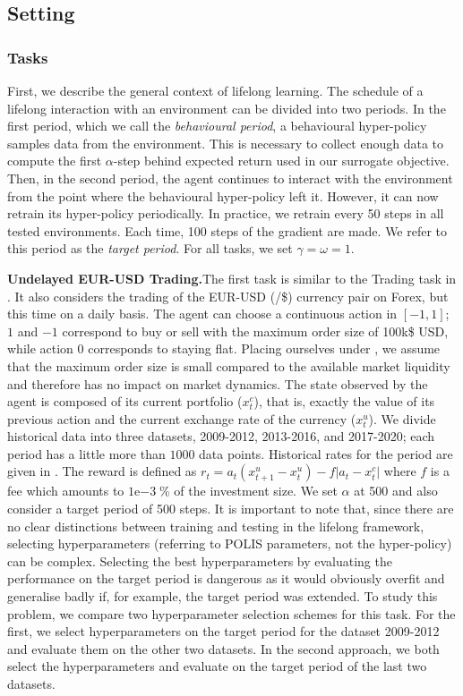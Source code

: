 \subsection{Setting}
\label{subsec:setting_exp_lifelong}


\subsubsection{Tasks}
First, we describe the general context of lifelong learning. 
The schedule of a lifelong interaction with an environment can be divided into two periods. 
In the first period, which we call the \emph{behavioural period}, a behavioural hyper-policy samples data from the environment. 
This is necessary to collect enough data to compute the first {$\alpha$-step behind expected return} used in our surrogate objective.
Then, in the second period, the agent continues to interact with the environment from the point where the behavioural hyper-policy left it. However, it can now retrain its hyper-policy periodically.
In practice, we retrain every 50 steps in all tested environments.
Each time, 100 steps of the gradient are made.
We refer to this period as the \emph{target period}.
For all tasks, we set $\gamma=\omega=1$.

\noindent\textbf{Undelayed EUR-USD Trading.}\indent The first task is similar to the Trading task in . 
It also considers the trading of the EUR-USD (\texteuro/\$) currency pair on Forex, but this time on a daily basis.
The agent can choose a continuous action in $[-1,1]$; $1$ and $-1$ correspond to buy or sell with the maximum order size of 100k\$ USD, while action $0$ corresponds to staying flat.
Placing ourselves under , we assume that the maximum order size is small compared to the available market liquidity and therefore has no impact on market dynamics.
The state observed by the agent is composed of its current portfolio ($x_{t}^{c}$), that is, exactly the value of its previous action and the current exchange rate of the currency ($x_{t}^{u}$).
We divide historical data into three datasets, 2009-2012, 2013-2016, and 2017-2020; each period has a little more than $1000$ data points.
Historical rates for the period are given in .
The reward is defined as $r_{t}=a_t(x_{t+1}^{u}-x_{t}^{u})-f\lvert a_t - x_{t}^{c}\rvert$ where $f$ is a fee which amounts to $1\mathrm{e}{-3}\;\%$ of the investment size.
We set $\alpha$ at 500 and also consider a target period of 500 steps.
It is important to note that, since there are no clear distinctions between training and testing in the lifelong framework, selecting hyperparameters (referring to POLIS parameters, not the hyper-policy) can be complex.
Selecting the best hyperparameters by evaluating the performance on the target period is dangerous as it would obviously overfit and generalise badly if, for example, the target period was extended.
To study this problem, we compare two hyperparameter selection schemes for this task.
For the first, we select hyperparameters on the target period for the dataset 2009-2012 and evaluate them on the other two datasets.
In the second approach, we both select the hyperparameters and evaluate on the target period of the last two datasets.

